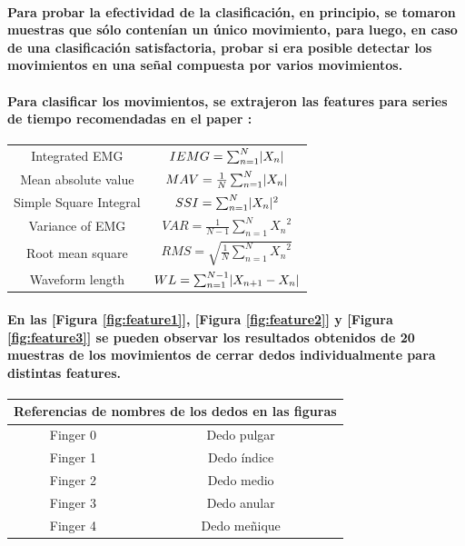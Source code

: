 \documentclass{article}
\DeclarePairedDelimiter\abs{\lvert}{\rvert}%
\begin{document}
\paragraph{
Para probar la efectividad de la clasificación, en principio, se tomaron muestras que sólo contenían un único movimiento, para luego, en caso de una clasificación satisfactoria, probar si era posible detectar los movimientos en una señal compuesta por varios movimientos.
}
\paragraph{
Para clasificar los movimientos, se extrajeron las features para series de tiempo recomendadas en el paper \cite{angkoon2009}:
}

\begin{center}
\begin{tabular}{ c c }
 Integrated EMG & $IEMG = \sum_{n=1}^{N} \abs{X_n}$ \\
 Mean absolute value & $MAV = \frac{1}{N} \sum_{n=1}^{N} \abs{X_n}$ \\
 Simple Square Integral & $SSI = \sum_{n=1}^{N}\abs{X_n}^2$ \\
 Variance of EMG & $VAR = \frac{1}{N-1} \sum_{n=1}^{N} {X_n}^2$ \\
 Root mean square & $RMS = \sqrt{\frac{1}{N} \sum_{n=1}^{N} {X_n}^2}$ \\
 Waveform length & $WL = \sum_{n=1}^{N-1} \abs{X_{n + 1} - X_n}$
\end{tabular}
\end{center}

\paragraph{
En las [Figura \ref{fig:feature1}], [Figura \ref{fig:feature2}] y [Figura \ref{fig:feature3}] se pueden observar los resultados obtenidos de 20 muestras de los movimientos de cerrar dedos individualmente para distintas features.
}

\begin{center}
\begin{tabular}{ |c|c| }
\hline
\multicolumn{2}{|c|}{Referencias de nombres de los dedos en las figuras} \\
\hline
 Finger 0 & Dedo pulgar \\
 Finger 1 & Dedo índice \\
 Finger 2 & Dedo medio \\
 Finger 3 & Dedo anular \\
 Finger 4 & Dedo meñique \\
\hline
\end{tabular}
\end{center}
\end{document}
